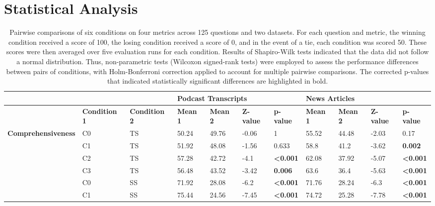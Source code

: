 \documentclass{article}
\begin{document}
\raggedbottom

\pagebreak
\section{Statistical Analysis}
\label{app:stats} 


\begin{table}[htp]
\tiny
\centering
\caption{Pairwise comparisons of six conditions on four metrics across 125 questions and two datasets. For each question and metric, the winning condition received a score of 100, the losing condition received a score of 0, and in the event of a tie, each condition was scored 50. These scores were then averaged over five evaluation runs for each condition. Results of Shapiro-Wilk tests indicated that the data did not follow a normal distribution. Thus, non-parametric tests (Wilcoxon signed-rank tests) were employed to assess the performance differences between pairs of conditions, with Holm-Bonferroni correction applied to account for multiple pairwise comparisons. The corrected p-values that indicated statistically significant differences are highlighted in bold.}
\begin{tabular}{l l l l l l l l l l l}  
\hline
& & & \multicolumn{4}{l}{\textbf{Podcast Transcripts}} & \multicolumn{4}{l}{\textbf{News Articles}} \\
\hline
& \textbf{Condition 1} & \textbf{Condition 2} & \textbf{Mean 1} & \textbf{Mean 2} & \textbf{Z-value} & \textbf{p-value} & \textbf{Mean 1} & \textbf{Mean 2} & \textbf{Z-value} & \textbf{p-value} \\
 \hline
\multirow{15}{*}{\textbf{Comprehensiveness}} & C0 & TS & 50.24 & 49.76 & -0.06 & 1
& 55.52 & 44.48 & -2.03 & 0.17
\\
 & C1 & TS & 51.92 & 48.08 & -1.56 & 0.633
& 58.8 & 41.2 & -3.62 &\textbf{ 0.002}
\\
 & C2 & TS & 57.28 & 42.72 & -4.1 & \textbf{\textless0.001}
& 62.08 & 37.92 & -5.07 &\textbf{\textless0.001}
\\
 & C3 & TS & 56.48 & 43.52 & -3.42 &\textbf{ 0.006}
& 63.6 & 36.4 & -5.63 & \textbf{\textless0.001}
\\
 & C0 & SS & 71.92 & 28.08 & -6.2 & \textbf{\textless0.001}
& 71.76 & 28.24 & -6.3 & \textbf{\textless0.001}
\\
 & C1 & SS & 75.44 & 24.56 & -7.45 &\textbf{\textless0.001}
& 74.72 & 25.28 & -7.78 & \textbf{\textless0.001}
\\

\end{tabular}
\end{table}
\end{document}
